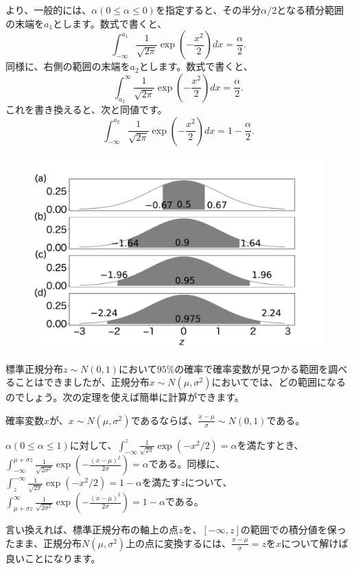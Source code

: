 より、一般的には、$\alpha(0\leq \alpha \leq 0)$を指定すると、その半分$\alpha/2$となる積分範囲の末端を$a_1$とします。数式で書くと、
\begin{equation}
    \int_{-\infty}^{a_1} \frac{1}{\sqrt{2\pi}}\exp(-\frac{x^2}{2})dx = \frac{\alpha}{2}.
\end{equation}
同様に、右側の範囲の末端を$a_2$とします。数式で書くと、
\begin{equation*}
    \int_{a_2}^{\infty} \frac{1}{\sqrt{2\pi}}\exp(-\frac{x^2}{2})dx = \frac{\alpha}{2}.
\end{equation*}
これを書き換えると、次と同値です。
\begin{equation*}
    \int_{-\infty}^{a_2} \frac{1}{\sqrt{2\pi}}\exp(-\frac{x^2}{2})dx = 1-\frac{\alpha}{2}.
\end{equation*}

\begin{figure}
\begin{center}
    \includegraphics[width=15cm]{./image/02_/z_value.pdf}
  \end{center}
\end{figure}

標準正規分布$z\sim N(0,1)$において$95\%$の確率で確率変数が見つかる範囲を調べることはできましたが、正規分布$x\sim N(\mu,\sigma^2)$においてでは、どの範囲になるのでしょう。次の定理を使えば簡単に計算ができます。
\begin{theo}
    確率変数$x$が、$x\sim N(\mu,\sigma^2)$であるならば、$\frac{x-\mu}{\sigma}\sim N(0,1)$である。    
\end{theo}
\begin{theo}
$\alpha(0\leq \alpha\leq 1)$に対して、$\int_{-\infty}^{z}\frac{1}{\sqrt{2\pi}}\exp(-x^2/2)=\alpha$を満たすとき、$\int_{-\infty}^{\mu+\sigma z} \frac{1}{\sqrt{2\sigma^2}}\exp(-\frac{(x-\mu)^2}{2\sigma})=\alpha$である。同様に、$\int_{z}^{-\infty}\frac{1}{\sqrt{2\pi}}\exp(-x^2/2)=1-\alpha$を満たす$z$について、$\int_{\mu+\sigma z}^{\infty} \frac{1}{\sqrt{2\sigma^2}}\exp(-\frac{(x-\mu)^2}{2\sigma})=1-\alpha$である。
\end{theo}
言い換えれば、標準正規分布の軸上の点$z$を、$[-\infty,z]$の範囲での積分値を保ったまま、正規分布$N(\mu,\sigma^2)$上の点に変換するには、$\frac{x-\mu}{\sigma}=z$を$x$について解けば良いことになります。

